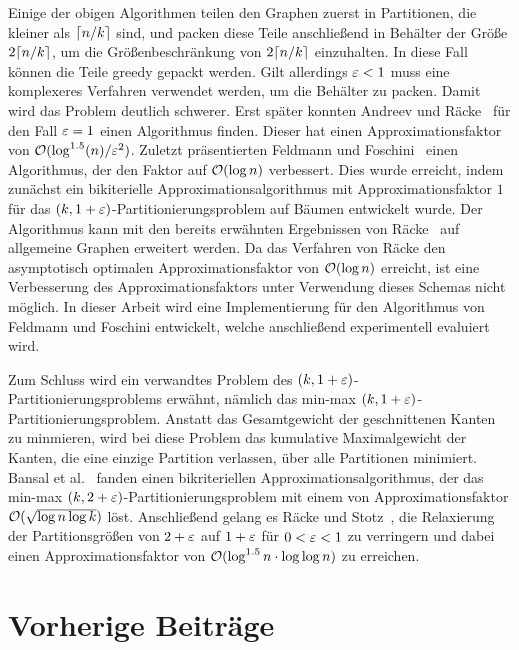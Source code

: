 Einige der obigen Algorithmen teilen den Graphen zuerst in Partitionen, die kleiner als $\lceil n/k\rceil$ sind, und packen diese Teile anschließend in Behälter der Größe $2 \lceil n/k\rceil$, um die Größenbeschränkung von $2 \lceil n/k\rceil$ einzuhalten.
In diese Fall können die Teile greedy gepackt werden.
Gilt allerdings $\varepsilon < 1$ muss eine komplexeres Verfahren verwendet werden, um die Behälter zu packen. 
Damit wird das Problem deutlich schwerer.
Erst später konnten Andreev und Räcke~\cite{ar06} für den Fall $\varepsilon = 1$ einen Algorithmus finden.
Dieser hat einen Approximationsfaktor von $\mathcal{O}(\log^{1.5}(n)/\varepsilon^2)$.
Zuletzt präsentierten Feldmann und Foschini~\cite{ff13} einen Algorithmus, der den Faktor auf $\mathcal{O}(\log n)$ verbessert.
Dies wurde erreicht, indem zunächst ein bikiterielle Approximationsalgorithmus mit Approximationsfaktor $1$ für das $(k,1+\varepsilon)$\hyp Partitionierungsproblem auf Bäumen entwickelt wurde.
Der Algorithmus kann mit den bereits erwähnten Ergebnissen von Räcke~\cite{rc08} auf allgemeine Graphen erweitert werden.
Da das Verfahren von Räcke den asymptotisch optimalen Approximationsfaktor von $\mathcal{O}(\log n)$ erreicht, ist eine Verbesserung des Approximationsfaktors unter Verwendung dieses Schemas nicht möglich.
In dieser Arbeit wird eine Implementierung für den Algorithmus von Feldmann und Foschini entwickelt, welche anschließend experimentell evaluiert wird.

Zum Schluss wird ein verwandtes Problem des $(k, 1+\varepsilon)$\hyp Partitionierungsproblems erwähnt, nämlich das min-max $(k, 1+\varepsilon)$\hyp Partitionierungsproblem.
Anstatt das Gesamtgewicht der geschnittenen Kanten zu minmieren, wird bei diese Problem das kumulative Maximalgewicht der Kanten, die eine einzige Partition verlassen, über alle Partitionen minimiert.
Bansal et al.~\cite{BFK+11} fanden einen bikriteriellen Approximationsalgorithmus, der das min-max $(k, 2 + \varepsilon)$\hyp Partitionierungsproblem mit einem von Approximationsfaktor $\mathcal{O}(\sqrt{\log n \log k})$ löst.
Anschließend gelang es Räcke und Stotz~\cite{RS16}, die Relaxierung der Partitionsgrößen von $2 + \varepsilon$ auf $1 + \varepsilon$ für $0 < \varepsilon < 1$ zu verringern und dabei einen Approximationsfaktor von $\mathcal{O}(\log^{1.5} n \cdot \log \log n)$ zu erreichen.
\section{Vorherige Beiträge}
